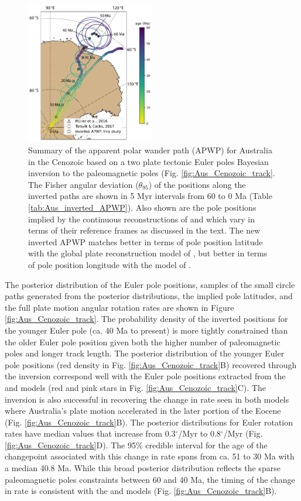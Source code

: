 \documentclass[11pt,letterpaper]{article}
\begin{document}
\begin{figure}
\centering
\includegraphics[width=0.5\textwidth]{fig_aus_predicted_APWP.pdf}
\caption{Summary of the apparent polar wander path (APWP) for Australia in the Cenozoic based on a two plate tectonic Euler poles Bayesian inversion to the paleomagnetic poles (Fig. \ref{fig:Aus_Cenozoic_track}. The Fisher angular deviation ($\theta_{95}$) of the positions along the inverted paths are shown in 5 Myr intervals from 60 to 0 Ma (Table \ref{tab:Aus_inverted_APWP}). Also shown are the pole positions implied by the continuous reconstructions of \cite{Muller2016a} and \cite{Torsvik2017a} which vary in terms of their reference frames as discussed in the text. The new inverted APWP matches better in terms of pole position latitude with the global plate reconstruction model of \cite{Muller2016a}, but better in terms of pole position longitude with the model of \cite{Torsvik2017a}.}
\label{fig:Aus_inverted_APWP}
\end{figure}

The posterior distribution of the Euler pole positions, samples of the small circle paths generated from the posterior distributions, the implied pole latitudes, and the full plate motion angular rotation rates are shown in Figure \ref{fig:Aus_Cenozoic_track}. The probability density of the inverted positions for the younger Euler pole (ca. 40 Ma to present) is more tightly constrained than the older Euler pole position given both the higher number of paleomagnetic poles and longer track length. The posterior distribution of the younger Euler pole positions (red density in Fig. \ref{fig:Aus_Cenozoic_track}B) recovered through the inversion correspond well with the Euler pole positions extracted from the \cite{Muller2016a} and \cite{Torsvik2017a} models (red and pink stars in Fig. \ref{fig:Aus_Cenozoic_track}C). The inversion is also successful in recovering the change in rate seen in both models where Australia's plate motion accelerated in the later portion of the Eocene (Fig. \ref{fig:Aus_Cenozoic_track}B). The posterior distributions for Euler rotation rates have median values that increase from 0.3$^\circ$/Myr to 0.8$^\circ$/Myr (Fig. \ref{fig:Aus_Cenozoic_track}D). The 95\% credible interval for the age of the changepoint associated with this change in rate spans from ca. 51 to 30 Ma with a median 40.8 Ma. While this broad posterior distribution reflects the sparse paleomagnetic poles constraints between 60 and 40 Ma, the timing of the change in rate is consistent with the \cite{Muller2016a} and \cite{Torsvik2017a} models (Fig. \ref{fig:Aus_Cenozoic_track}B). 
\end{document}
